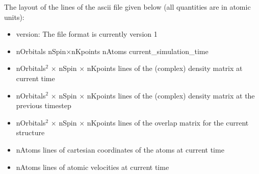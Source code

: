 The layout of the lines of the ascii file given below (all quantities are in
atomic units):

\begin{itemize}
\item version: The file format is currently version 1
\item nOrbitals nSpin$\times$nKpoints nAtoms current\_simulation\_time
\item nOrbitals$^2$ $\times$ nSpin $\times$ nKpoints lines of the (complex)
  density matrix at current time
\item nOrbitals$^2$ $\times$ nSpin $\times$ nKpoints lines of the (complex)
  density matrix at the previous timestep
\item nOrbitals$^2$ $\times$ nSpin $\times$ nKpoints lines of the overlap matrix
  for the current structure
\item nAtoms lines of cartesian coordinates of the atoms at current time
\item nAtoms lines of atomic velocities at current time
\end{itemize}
